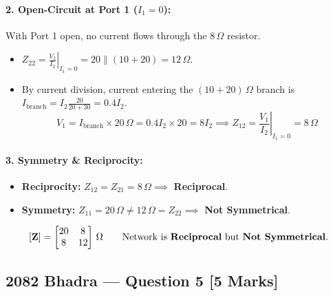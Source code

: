 \documentclass[11pt,a4paper,oneside]{article}
\begin{document}
\paragraph{2. Open-Circuit at Port 1 ($I_1 = 0$):}
With Port 1 open, no current flows through the $8\,\Omega$ resistor.
\begin{itemize}[leftmargin=1.5em]
  \item $Z_{22} = \left.\frac{V_2}{I_2}\right|_{I_1=0} = 20 \parallel (10 + 20) = 12\,\Omega$.
  \item By current division, current entering the $(10+20)\,\Omega$ branch is $I_{\text{branch}} = I_2 \frac{20}{20 + 30} = 0.4 I_2$.
  \[
  V_1 = I_{\text{branch}} \times 20\,\Omega = 0.4 I_2 \times 20 = 8 I_2 \implies Z_{12} = \left.\frac{V_1}{I_2}\right|_{I_1=0} = 8\,\Omega
  \]
\end{itemize}

\paragraph{3. Symmetry \& Reciprocity:}
\begin{itemize}[leftmargin=1.5em]
  \item \textbf{Reciprocity:} $Z_{12} = Z_{21} = 8\,\Omega \implies$ \textbf{Reciprocal}.
  \item \textbf{Symmetry:} $Z_{11} = 20\,\Omega \ne 12\,\Omega = Z_{22} \implies$ \textbf{Not Symmetrical}.
\end{itemize}

\begin{answerbox}
\[
\mathbf{[Z]} = \begin{bmatrix} 20 & 8 \\ 8 & 12 \end{bmatrix}\,\Omega \qquad \text{Network is \textbf{Reciprocal} but \textbf{Not Symmetrical}.}
\]
\end{answerbox}

\newpage

\subsection{2082 Bhadra --- Question 5 [5 Marks]}
\end{document}
